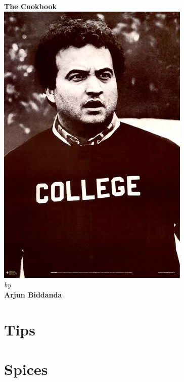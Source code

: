 \documentclass[oneside]{recipe}
\begin{document}
\begin{titlepage}
\begin{center}
	\textbf{\Huge The Cookbook }\\
	\vspace*{\fill}
	\includegraphics[scale=2]{img/college}\\
	\vspace*{\fill}
	\textit{\large by}\\
	\vspace*{4pt}
	\textbf{\large Arjun Biddanda}
	\vspace*{\fill}
	\end{center}
\end{titlepage}

\tableofcontents
% 

\chapter{Tips}


\chapter{Spices}

\end{document}
